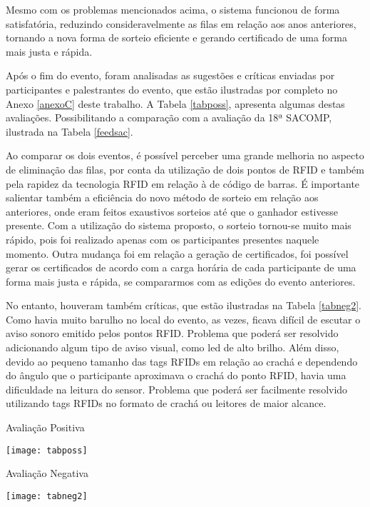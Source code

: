 \documentclass[tcc,capa]{texufpel}
\begin{document}
    Mesmo com os problemas mencionados acima, o sistema funcionou de forma satisfatória, reduzindo consideravelmente as filas em relação aos anos anteriores, tornando a nova forma de sorteio eficiente e gerando certificado de uma forma mais justa e rápida. 
    
     Após o fim do evento, foram analisadas as sugestões e críticas enviadas por participantes e palestrantes do evento, que estão ilustradas por completo no Anexo \ref{anexoC}  deste trabalho. A Tabela \ref{tabposs}, apresenta algumas destas avaliações. Possibilitando a comparação com a avaliação da 18ª SACOMP, ilustrada na Tabela \ref{feedsac}.
     
     Ao comparar os dois eventos, é possível perceber uma grande melhoria no aspecto de  eliminação das filas, por conta da utilização de dois pontos de RFID e também pela rapidez da tecnologia RFID em relação à de código de barras. É importante salientar também a eficiência do novo método de sorteio em relação aos anteriores, onde eram feitos exaustivos sorteios até que o ganhador estivesse presente. Com a utilização do sistema proposto, o sorteio tornou-se muito mais rápido, pois foi realizado apenas com os participantes presentes naquele momento.
     Outra mudança foi em relação a geração de certificados, foi possível gerar os certificados de acordo com a carga horária de cada participante de uma forma mais justa e rápida, se compararmos com as edições do evento anteriores.
     
     No entanto, houveram também críticas, que estão ilustradas na Tabela \ref{tabneg2}. Como havia muito barulho no local do evento, as vezes, ficava difícil de escutar o aviso sonoro emitido pelos pontos RFID. Problema que poderá ser resolvido adicionando algum tipo de aviso visual, como led de alto brilho. Além disso, devido ao pequeno tamanho das tags RFIDs em relação ao crachá e dependendo do ângulo que o participante aproximava o crachá do ponto RFID, havia uma dificuldade na leitura do sensor. Problema que poderá ser facilmente resolvido utilizando tags RFIDs no formato de crachá ou leitores de maior alcance. 
       \begin{table}[H]
            \caption{Avaliação Positiva} 
            \centering \texttt{[image: tabposs]}
             \label{tabposs}
        \end{table}
        \begin{table}[H]
            \caption{Avaliação Negativa} 
            \centering \texttt{[image: tabneg2]}
             \label{tabneg2}
        \end{table}
        
\end{document}
